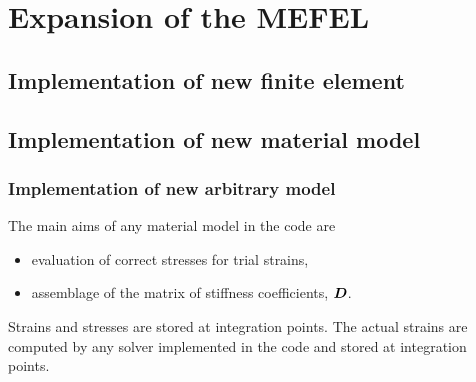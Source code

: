 \chapter{Expansion of the MEFEL}
\section{Implementation of new finite element}
\section{Implementation of new material model}
\subsection{Implementation of new arbitrary model}
The main aims of any material model in the code are
\begin{itemize}
\item{evaluation of correct stresses for trial strains,}
\item{assemblage of the matrix of stiffness coefficients, $\mbox{\boldmath$D$}$.}
\end{itemize}

Strains and stresses are stored at integration points. The actual strains are computed by any solver
implemented in the code and stored at integration points. 

